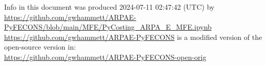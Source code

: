 {\footnotesize
\noindent
Info in this document was produced 2024-07-11 02:47:42 (UTC) by\\
\url{https://github.com/gwhammett/ARPAE-PyFECONS/blob/main/MFE/PyCosting_ARPA_E_MFE.ipynb}\\
\url{https://github.com/gwhammett/ARPAE-PyFECONS}
is a modified version of the open-source version in:\\
\url{https://github.com/gwhammett/ARPAE-PyFECONS-open-orig}
} %
